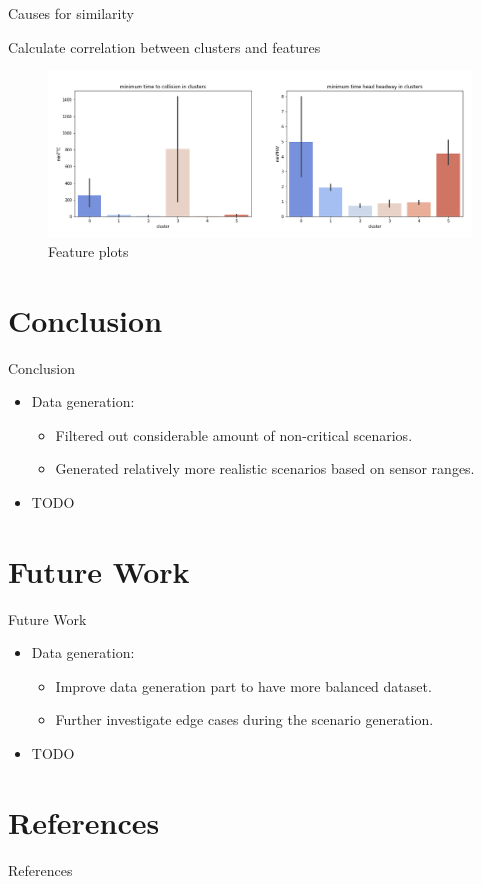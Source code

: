 \documentclass[shortpres]{beamer}
\begin{document}
\begin{frame}{Causes for similarity}

Calculate correlation between clusters and features

\begin{figure}[h!]
  \centering
    \includegraphics[width=\textwidth]{clusters.png}
  \vspace{-2.4em}
  \caption{Feature plots}
\end{figure}

\end{frame}

\section{Conclusion}

\begin{frame}{Conclusion}

\begin{itemize} 
\item Data generation:
	\begin{itemize}
	\item Filtered out considerable amount of non-critical scenarios.
	\item Generated relatively more realistic scenarios based on sensor ranges.
	\end{itemize}
\item TODO
\end{itemize}

\end{frame}

\section{Future Work}

\begin{frame}{Future Work}

\begin{itemize} 
\item Data generation:
	\begin{itemize}
	\item Improve data generation part to have more balanced dataset.
	\item Further investigate edge cases during the scenario generation.
	\end{itemize}
\item TODO
\end{itemize}

\end{frame}

\section{References}

\begin{frame}{References}
	\printbibliography
\end{frame}
\end{document}
